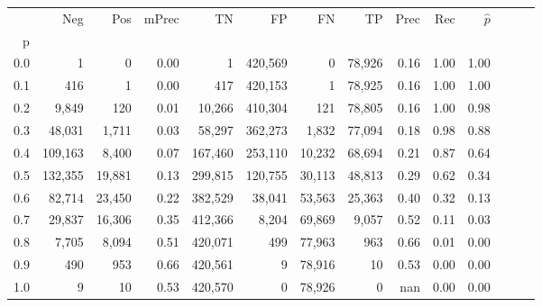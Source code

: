 \begin{tabular}{rrrrrrrrrrrrrr}
\toprule
{} &      Neg &     Pos & mPrec &       TN &       FP &      FN &      TP &  Prec &   Rec & $\hat{p}$ \\
p   &          &         &       &          &          &         &         &       &       &           \\
\midrule
0.0 &        1 &       0 &  0.00 &        1 &  420,569 &       0 &  78,926 &  0.16 &  1.00 &      1.00 \\
0.1 &      416 &       1 &  0.00 &      417 &  420,153 &       1 &  78,925 &  0.16 &  1.00 &      1.00 \\
0.2 &    9,849 &     120 &  0.01 &   10,266 &  410,304 &     121 &  78,805 &  0.16 &  1.00 &      0.98 \\
0.3 &   48,031 &   1,711 &  0.03 &   58,297 &  362,273 &   1,832 &  77,094 &  0.18 &  0.98 &      0.88 \\
0.4 &  109,163 &   8,400 &  0.07 &  167,460 &  253,110 &  10,232 &  68,694 &  0.21 &  0.87 &      0.64 \\
0.5 &  132,355 &  19,881 &  0.13 &  299,815 &  120,755 &  30,113 &  48,813 &  0.29 &  0.62 &      0.34 \\
0.6 &   82,714 &  23,450 &  0.22 &  382,529 &   38,041 &  53,563 &  25,363 &  0.40 &  0.32 &      0.13 \\
0.7 &   29,837 &  16,306 &  0.35 &  412,366 &    8,204 &  69,869 &   9,057 &  0.52 &  0.11 &      0.03 \\
0.8 &    7,705 &   8,094 &  0.51 &  420,071 &      499 &  77,963 &     963 &  0.66 &  0.01 &      0.00 \\
0.9 &      490 &     953 &  0.66 &  420,561 &        9 &  78,916 &      10 &  0.53 &  0.00 &      0.00 \\
1.0 &        9 &      10 &  0.53 &  420,570 &        0 &  78,926 &       0 &   nan &  0.00 &      0.00 \\
\bottomrule
\end{tabular}
